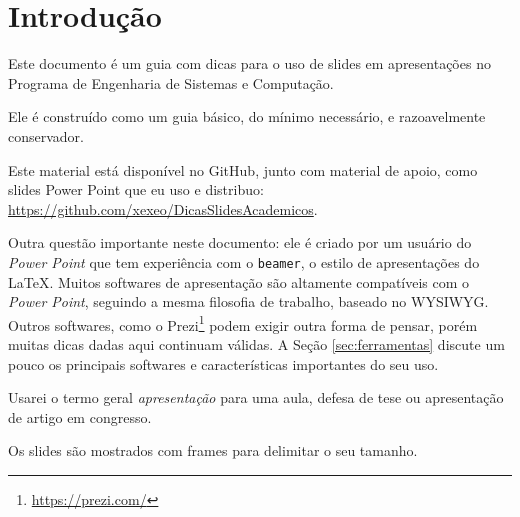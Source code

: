 \section{Introdução}

Este documento é um guia com dicas para o uso de slides em apresentações no Programa de Engenharia de Sistemas e Computação.

Ele é construído como um guia básico, do mínimo necessário, e razoavelmente conservador.

Este material está disponível no GitHub, junto com material de apoio, como slides Power Point que eu uso e distribuo: \url{https://github.com/xexeo/DicasSlidesAcademicos}.

Outra questão importante neste documento: ele é criado por um usuário do \textit{Power Point} que tem experiência com o \texttt{beamer}, o estilo de apresentações do \LaTeX. Muitos softwares de apresentação são altamente compatíveis com o \textit{Power Point}, seguindo a mesma filosofia de trabalho, baseado no WYSIWYG. Outros softwares, como o Prezi\footnote{\url{https://prezi.com/}} podem exigir outra forma de pensar, porém muitas dicas dadas aqui continuam válidas. A Seção \ref{sec:ferramentas} discute um pouco os principais softwares e características importantes do seu uso.

Usarei o termo geral \textit{apresentação} para uma aula, defesa de tese ou apresentação de artigo em congresso.

Os slides são mostrados com frames para delimitar o seu tamanho.


